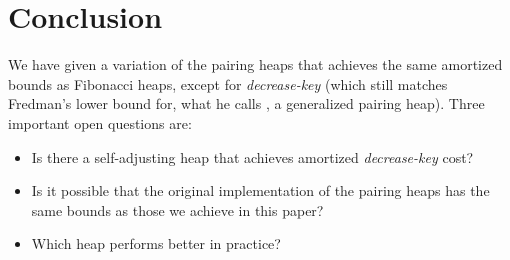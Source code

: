 \section{Conclusion}
We have given a variation of the pairing heaps that achieves the same amortized bounds as Fibonacci heaps, except for {\it decrease-key} (which still matches Fredman's lower bound for, what he calls \cite{f}, a generalized pairing heap). Three important open questions are:

\begin{itemize}
\item Is there a self-adjusting heap that achieves amortized  {\it decrease-key} cost?
\item Is it possible that the original implementation of the pairing heaps has the same bounds as those we achieve in this paper?
\item Which heap performs better in practice? 
\end{itemize}




